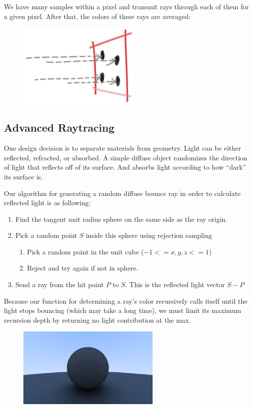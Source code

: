 \documentclass[conference]{IEEEtran}
\begin{document}
We have many samples within a pixel and transmit rays through each of them for a given pixel. After that, the colors of these rays are averaged:
\begin{figure}[h]
\includegraphics[width=6cm]{images/ch7.jpg}
\centering
\end{figure}

\subsection{Advanced Raytracing}
One design decision is to separate materials from geometry. Light can be either reflected, refracted, or absorbed. A simple diffuse object randomizes the direction of light that reflects off of its surface. And absorbs light according to how “dark” its surface is.

Our algorithm for generating a random diffuse bounce ray in order to calculate reflected light is as following:
\begin{enumerate}
  \item Find the tangent unit radius sphere on the same side as the ray origin.
  \item Pick a random point $S$ inside this sphere using rejection sampling
  \begin{enumerate}
      \item Pick a random point in the unit cube ($-1 <= x,y,z <= 1$)
      \item Reject and try again if not in sphere.
  \end{enumerate}
  \item Send a ray from the hit point $P$ to $S$. This is the reflected light vector $S - P$
\end{enumerate}

Because our function for determining a ray’s color recursively calls itself until the light stops bouncing (which may take a long time), we must limit its maximum recursion depth by returning no light contribution at the max.

\begin{figure}[h]
\includegraphics[width=7cm]{images/diffuse_sphere.png}
\centering
\end{figure}
\end{document}
